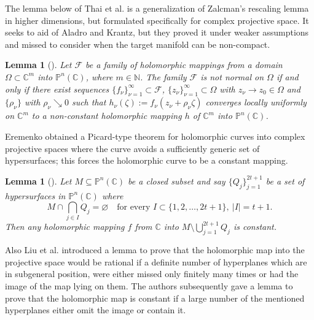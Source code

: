 \documentclass[11pt, reqno]{amsart}
\newtheorem{lemma}[theorem]{Lemma}
\theoremstyle{definition}
\theoremstyle{remark}
\numberwithin{equation}{section}
\begin{document}
The lemma below of Thai et al. is a generalization of Zalcman's rescaling lemma in higher dimensions, but formulated specifically for complex projective space. It seeks to aid \cite[Theorem 3.1]{ala-acfnicn-1991} of 
Aladro and Krantz, but they proved it under weaker assumptions and missed to consider when the target manifold can be non-compact.  
\begin{lemma}[{\cite[Theorem 2.5]{thai-fonmiscvahocs-2003}}] \label{L-Thai_Zalcman_Projective} 
Let $\mathcal{F}$ be a family of holomorphic mappings from a domain $\Omega\subset \mathbb{C}^m$ into $\mathbb{P}^n(\mathbb{C})$, where $m\in\mathbb N$. The family 
$\mathcal{F}$ is not normal on $\Omega$ if and only if there exist sequences $\{f_{\nu}\}_{\nu=1}^\infty \subset \mathcal{F}$, $\{z_{\nu}\}_{\nu=1}^\infty \subset \Omega$ with 
$z_{\nu} \to z_0 \in \Omega$ and $\{\rho_{\nu}\}$ with $\rho_{\nu}\searrow 0$ such that
$h_{\nu}(\zeta) := f_{\nu}(z_{\nu} + \rho_{\nu} \zeta)$
converges locally uniformly on $\mathbb{C}^m$ to a non-constant holomorphic mapping $h$ of $\mathbb{C}^m$ into 
$\mathbb{P}^n(\mathbb{C})$.
\end{lemma}
Eremenko obtained a Picard-type theorem \cite[Theorem 1]{ere-apttfhc-1999} for holomorphic curves into complex projective 
spaces where the curve avoids a sufficiently generic set of hypersurfaces; this forces the holomorphic curve to be a constant mapping. 
\begin{lemma}[{\cite[Theorem 1]{ere-apttfhc-1999}}] \label{L-Ere_omitting_hypersurface_general_position_implies_constant} 
Let $M \subseteq \mathbb{P}^n(\mathbb{C})$ be a closed subset  and say $\{Q_{j}\}_{j=1}^{2t+1}$ be a set of hypersurfaces in 
$\mathbb{P}^n(\mathbb{C})$ where
\begin{equation*}
M \cap \bigcap_{j \in I} Q_{j} = \varnothing
\quad \text{for every } I \subset \{1,2,\ldots,2t+1\},\ |I| = t+1.
\end{equation*}
Then any holomorphic mapping $f$ from $\mathbb{C}$ into
$M \setminus \bigcup_{j=1}^{2t+1} Q_{j}$ is constant.
\end{lemma}
Also Liu et al. introduced a lemma \cite[Lemma 3.7]{liu-ofommitcps-2016} to prove that the holomorphic map into the projective space would 
be rational if a definite number of hyperplanes which are in subgeneral position, were either missed only finitely many times
or had the image of the map lying on them. The authors subsequently gave a lemma \cite[Lemma 3.8]{liu-ofommitcps-2016} to 
prove that the holomorphic map is constant if a large number of the mentioned hyperplanes either omit the image or contain it.
\end{document}
